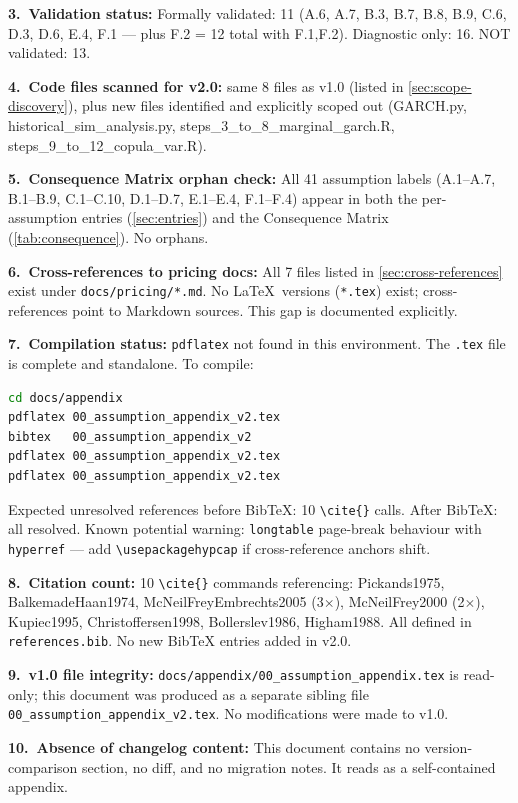 \documentclass[11pt,a4paper]{article}
\newcommand{\code}[1]{\texttt{#1}}
\begin{document}
\textbf{3.\ Validation status:}
Formally validated: 11 (A.6, A.7, B.3, B.7, B.8, B.9, C.6, D.3, D.6, E.4,
F.1 --- plus F.2 = 12 total with F.1,F.2). Diagnostic only: 16. NOT validated: 13.

\textbf{4.\ Code files scanned for v2.0:} same 8 files as v1.0 (listed in
\cref{sec:scope-discovery}), plus new files identified and explicitly scoped out
(GARCH.py, historical\_sim\_analysis.py, steps\_3\_to\_8\_marginal\_garch.R,
steps\_9\_to\_12\_copula\_var.R).

\textbf{5.\ Consequence Matrix orphan check:} All 41 assumption labels
(A.1--A.7, B.1--B.9, C.1--C.10, D.1--D.7, E.1--E.4, F.1--F.4) appear
in both the per-assumption entries (\cref{sec:entries}) and the Consequence
Matrix (\cref{tab:consequence}). No orphans.

\textbf{6.\ Cross-references to pricing docs:} All 7 files listed in
\cref{sec:cross-references} exist under \code{docs/pricing/*.md}.
No \LaTeX\ versions (\code{*.tex}) exist; cross-references point to Markdown
sources. This gap is documented explicitly.

\textbf{7.\ Compilation status:} \code{pdflatex} not found in this environment.
The \code{.tex} file is complete and standalone. To compile:
\begin{lstlisting}[language=bash]
cd docs/appendix
pdflatex 00_assumption_appendix_v2.tex
bibtex   00_assumption_appendix_v2
pdflatex 00_assumption_appendix_v2.tex
pdflatex 00_assumption_appendix_v2.tex
\end{lstlisting}
Expected unresolved references before BibTeX: 10 \verb|\cite{}| calls.
After BibTeX: all resolved. Known potential warning: \code{longtable}
page-break behaviour with \code{hyperref} --- add \code{\textbackslash usepackage{hypcap}}
if cross-reference anchors shift.

\textbf{8.\ Citation count:} 10 \verb|\cite{}| commands referencing:
Pickands1975, BalkemadeHaan1974, McNeilFreyEmbrechts2005 (3$\times$),
McNeilFrey2000 (2$\times$), Kupiec1995, Christoffersen1998, Bollerslev1986,
Higham1988. All defined in \code{references.bib}. No new BibTeX entries
added in v2.0.

\textbf{9.\ v1.0 file integrity:} \code{docs/appendix/00\_assumption\_appendix.tex}
is read-only; this document was produced as a separate sibling file
\code{00\_assumption\_appendix\_v2.tex}. No modifications were made to v1.0.

\textbf{10.\ Absence of changelog content:} This document contains no
version-comparison section, no diff, and no migration notes. It reads as a
self-contained appendix.



\end{document}
